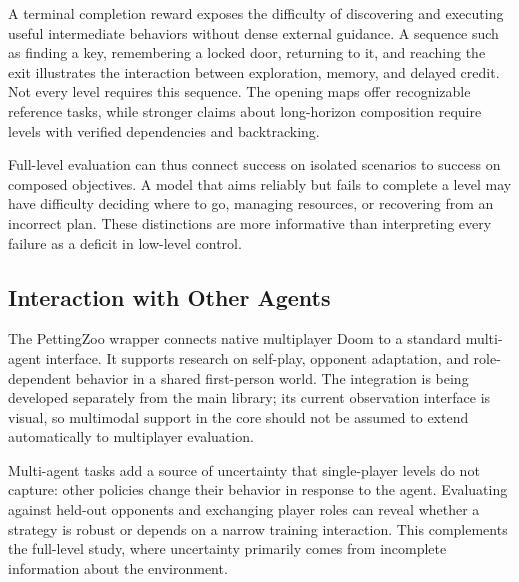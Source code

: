 A terminal completion reward exposes the difficulty of discovering and executing useful intermediate behaviors without dense external guidance. A sequence such as finding a key, remembering a locked door, returning to it, and reaching the exit illustrates the interaction between exploration, memory, and delayed credit. Not every level requires this sequence. The opening maps offer recognizable reference tasks, while stronger claims about long-horizon composition require levels with verified dependencies and backtracking.

Full-level evaluation can thus connect success on isolated scenarios to success on composed objectives. A model that aims reliably but fails to complete a level may have difficulty deciding where to go, managing resources, or recovering from an incorrect plan. These distinctions are more informative than interpreting every failure as a deficit in low-level control.

\subsection{Interaction with Other Agents}
The PettingZoo wrapper connects native multiplayer Doom to a standard multi-agent interface. It supports research on self-play, opponent adaptation, and role-dependent behavior in a shared first-person world. The integration is being developed separately from the main library; its current observation interface is visual, so multimodal support in the core should not be assumed to extend automatically to multiplayer evaluation.

Multi-agent tasks add a source of uncertainty that single-player levels do not capture: other policies change their behavior in response to the agent. Evaluating against held-out opponents and exchanging player roles can reveal whether a strategy is robust or depends on a narrow training interaction. This complements the full-level study, where uncertainty primarily comes from incomplete information about the environment.
